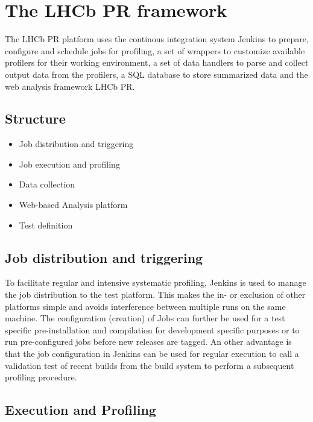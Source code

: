 \documentclass[a4paper]{jpconf}
\begin{document}
\section{The LHCb PR framework}
\label{sec:lhcbpr_framework}

The LHCb PR platform uses the continous integration system Jenkins \cite{jenkins} to prepare, configure and schedule jobs for profiling, a set of wrappers to customize available profilers for their working environment, a set of data handlers to parse and collect output data from the profilers, a SQL database to store summarized data and the web analysis framework LHCb PR. 

\subsection{Structure}
\label{sec:structure}

\begin{itemize}
 \item Job distribution and triggering
 \item Job execution and profiling
 \item Data collection
 \item Web-based Analysis platform
 \item Test definition
\end{itemize}

\subsection{Job distribution and triggering}
\label{sec:job_distribution}

To facilitate regular and intensive systematic profiling, Jenkins is used to manage the job distribution to the test platform. This makes the in- or exclusion of other platforms simple and avoids interference between multiple runs on the same machine. The configuration (creation) of Jobs can further be used for a test specific pre-installation and compilation for development specific purposes or to run pre-configured jobs before new releases are tagged.
\newline
An other advantage is that the job configuration in Jenkins can be used for regular execution to call a validation test of recent builds from the build system to perform a subsequent profiling procedure.  

\subsection{Execution and Profiling}
\label{sec:execution_and_profiling}
\end{document}
